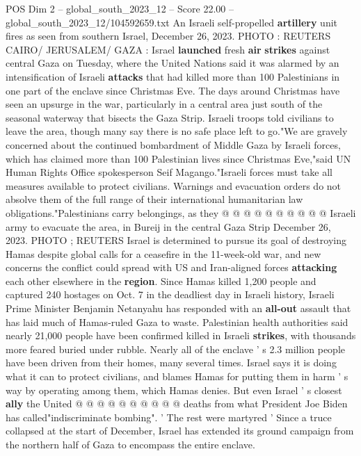 \begin{textsample}{POS Dim 2 – global\_south\_2023\_12 – Score 22.00 – global\_south\_2023\_12/104592659.txt}  \label{ex:f2_pos_153}
An Israeli self-propelled \textbf{artillery} unit fires as seen from southern Israel, December 26, 2023.
PHOTO : REUTERS CAIRO/ JERUSALEM/ GAZA : Israel \textbf{launched} fresh \textbf{air} \textbf{strikes} against central Gaza on Tuesday, where the United Nations said it was alarmed by an intensification of Israeli \textbf{attacks} that had killed more than 100 Palestinians in one part of the enclave since Christmas Eve.
The days around Christmas have seen an upsurge in the war, particularly in a central area just south of the seasonal waterway that bisects the Gaza Strip.
Israeli troops told civilians to leave the area, though many say there is no safe place left to go."We are gravely concerned about the continued bombardment of Middle Gaza by Israeli forces, which has claimed more than 100 Palestinian lives since Christmas Eve,"said UN Human Rights Office spokesperson Seif Magango."Israeli forces must take all measures available to protect civilians.
Warnings and evacuation orders do not absolve them of the full range of their international humanitarian law obligations."Palestinians carry belongings, as they @ @ @ @ @ @ @ @ @ @ Israeli army to evacuate the area, in Bureij in the central Gaza Strip December 26, 2023.
PHOTO ; REUTERS Israel is determined to pursue its goal of destroying Hamas despite global calls for a ceasefire in the 11-week-old war, and new concerns the conflict could spread with US and Iran-aligned forces \textbf{attacking} each other elsewhere in the \textbf{region}.
Since Hamas killed 1,200 people and captured 240 hostages on Oct. 7 in the deadliest day in Israeli history, Israeli Prime Minister Benjamin Netanyahu has responded with an \textbf{all-out} assault that has laid much of Hamas-ruled Gaza to waste.
Palestinian health authorities said nearly 21,000 people have been confirmed killed in Israeli \textbf{strikes}, with thousands more feared buried under rubble.
Nearly all of the enclave ' s 2.3 million people have been driven from their homes, many several times.
Israel says it is doing what it can to protect civilians, and blames Hamas for putting them in harm ' s way by operating among them, which Hamas denies.
But even Israel ' s closest \textbf{ally} the United @ @ @ @ @ @ @ @ @ @ deaths from what President Joe Biden has called"indiscriminate bombing". ' The rest were martyred ' Since a truce collapsed at the start of December, Israel has extended its ground campaign from the northern half of Gaza to encompass the entire enclave.

\end{textsample}
